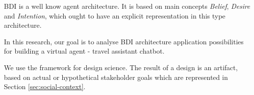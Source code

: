 \documentclass{llncs}
\begin{document}

\gls{BDI} \cite{rao1995bdi} is a well know agent architecture. It is based on main concepts  \emph{Belief}, \emph{Desire} and \emph{Intention}, which ought to have an explicit representation in this type architecture. 

In this research, our goal is to analyse \gls{BDI} architecture application possibilities for building a virtual agent - travel assistant chatbot.

We  use the framework \cite{wieringa2014design} for design science. The result of a design is an artifact, based on actual or hypothetical stakeholder goals which are represented in Section \ref{sec:social-context}. 

\end{document}
